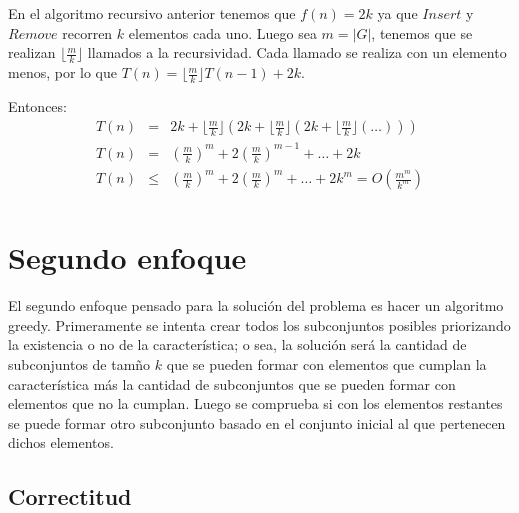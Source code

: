 \documentclass{article}
\begin{document}




En el algoritmo recursivo anterior tenemos que $f(n) = 2k$ ya que $Insert$ y $Remove$
recorren $k$ elementos cada uno. Luego sea $m = |G|$, tenemos que se realizan $\lfloor \frac{m}{k}\rfloor$
llamados a la recursividad. Cada llamado se realiza con un elemento menos, por lo que 
$T(n) = \lfloor \frac{m}{k} \rfloor T(n-1) + 2k$. 

Entonces: 
\begin{eqnarray*}
    T(n) &=& 2k + \lfloor \frac{m}{k} \rfloor(2k + \lfloor \frac{m}{k}\rfloor(2k + \lfloor \frac{m}{k}\rfloor(\dots)))\\
    T(n) &=& (\frac{m}{k})^m + 2(\frac{m}{k})^{m-1} + \dots + 2k \\
    T(n) &\leq& (\frac{m}{k})^m + 2(\frac{m}{k})^m + \dots + 2k^m = O(\frac{m^m}{k^m})\\
\end{eqnarray*}


\section*{Segundo enfoque}

El segundo enfoque pensado para la solución del problema es hacer un algoritmo greedy.
Primeramente se intenta crear todos los subconjuntos posibles priorizando la existencia o no
de la característica; o sea, la solución será la cantidad de subconjuntos de tamño $k$ que 
se pueden formar con elementos que cumplan la característica más la cantidad de subconjuntos 
que se pueden formar con elementos que no la cumplan. Luego se comprueba si con los elementos 
restantes se puede formar otro subconjunto basado en el conjunto inicial al que pertenecen dichos
elementos.

\subsection*{Correctitud}
\end{document}
